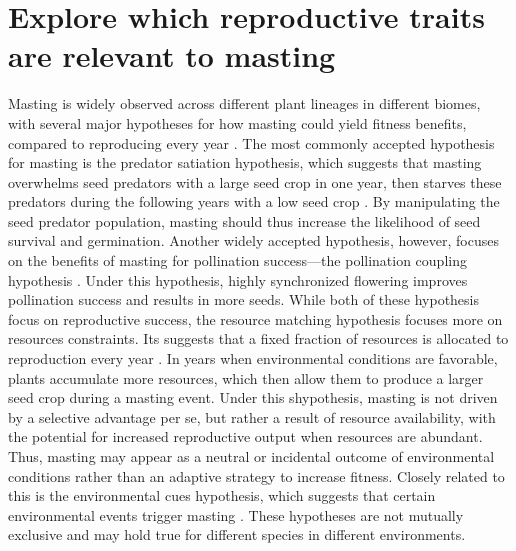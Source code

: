\documentclass[11pt,letter]{article}
\begin{document}
\section{Explore which reproductive traits are relevant to masting}
Masting is widely observed across different plant lineages in different biomes, with several major hypotheses for how masting could yield fitness benefits, compared to reproducing every year \citep{koenig2021brief, waller1979models}. The most commonly accepted hypothesis for masting is the predator satiation hypothesis, which suggests that masting overwhelms seed predators with a large seed crop in one year, then starves these predators during the following years with a low seed crop \citep{janzen1971seed}. By manipulating the seed predator population, masting should thus increase the likelihood of seed survival and germination. Another widely accepted hypothesis, however, focuses on the benefits of masting for pollination success---the pollination coupling hypothesis \citep{crone2014resource}. Under this hypothesis, highly synchronized flowering improves pollination success and results in more seeds. While both of these hypothesis focus on reproductive success, the resource matching hypothesis focuses more on resources constraints. Its suggests that a fixed fraction of resources is allocated to reproduction every year \citep{kelly1994evolutionary}. In years when environmental conditions are favorable, plants accumulate more resources, which then allow them to produce a larger seed crop during a masting event. Under this shypothesis, masting is not driven by a selective advantage per se, but rather a result of resource availability, with the potential for increased reproductive output when resources are abundant. Thus, masting may appear as a neutral or incidental outcome of environmental conditions rather than an adaptive strategy to increase fitness. Closely related to this is the environmental cues hypothesis, which suggests that certain environmental events trigger masting \citep{pearse2016mechanisms}. These hypotheses are not mutually exclusive and may hold true for different species in different environments.\par
\end{document}
